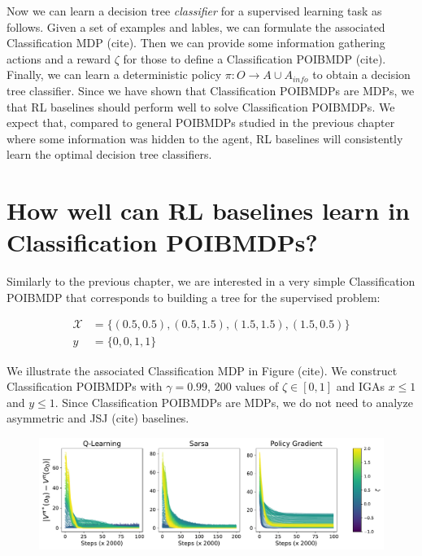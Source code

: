 Now we can learn a decision tree \textit{classifier} for a supervised learning task as follows. 
Given a set of examples and lables, we can formulate the associated Classification MDP (cite). 
Then we can provide some information gathering actions and a reward $\zeta$ for those to define a Classification POIBMDP (cite).
Finally, we can learn a deterministic policy $\pi : O \rightarrow A\cup A_{info}$ to obtain a decision tree classifier. 
Since we have shown that Classification POIBMDPs are MDPs, we that RL baselines should perform well to solve Classification POIBMDPs. 
We expect that, compared to general POIBMDPs studied in the previous chapter where some information was hidden to the agent, RL baselines will consistently learn the optimal decision tree classifiers.

\section{How well can RL baselines learn in Classification POIBMDPs?}
Similarly to the previous chapter, we are interested in a very simple Classification POIBMDP that corresponds to building a tree for the supervised problem:

\begin{align*}
    \mathcal{X} &= \{(0.5, 0.5), (0.5, 1.5), (1.5, 1.5), (1.5, 0.5)\}\\
    y &= \{0, 0, 1, 1\} 
\end{align*}

We illustrate the associated Classification MDP in Figure (cite). 
We construct Classification POIBMDPs with $\gamma=0.99$, 200 values of $\zeta \in [0,1]$ and IGAs $x\leq 1$ and $y\leq 1$.
Since Classification POIBMDPs are MDPs, we do not need to analyze asymmetric and JSJ (cite) baselines.

\begin{figure}
    \centering
    \includegraphics[width=1\textwidth]{images/images_part1/learning_curves_classif.pdf}
    \caption{}\label{fig:rl-classif-poibmdp}
\end{figure}

